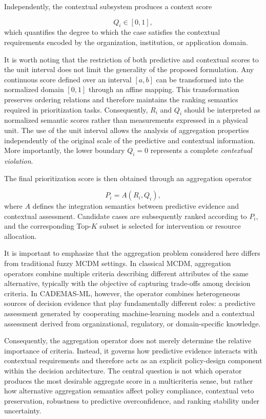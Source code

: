 \documentclass[mathematics,article,submit,moreauthors]{Definitions/mdpi}
\begin{document}
Independently, the contextual subsystem produces a context score

\begin{equation}
Q_i \in [0,1],
\end{equation}
which quantifies the degree to which the case satisfies the contextual
requirements encoded by the organization, institution, or application
domain.

It is worth noting that the restriction of both predictive and
contextual scores to the unit interval does not limit the generality of
the proposed formulation. Any continuous score defined over an interval
$[a,b]$ can be transformed into the normalized domain $[0,1]$ through an
affine mapping. This transformation preserves ordering relations and
therefore maintains the ranking semantics required in prioritization
tasks. Consequently, $R_i$ and $Q_i$ should be interpreted as normalized
semantic scores rather than measurements expressed in a physical unit.
The use of the unit interval allows the analysis of aggregation
properties independently of the original scale of the predictive and
contextual information. More importantly, the lower boundary \(Q_i=0\) represents a complete \textit{contextual violation}.

The final prioritization score is then obtained through an aggregation
operator

\begin{equation}
P_i=A(R_i,Q_i),
\end{equation}
where $A$ defines the integration semantics between predictive evidence
and contextual assessment. Candidate cases are subsequently ranked
according to $P_i$, and the corresponding Top-$K$ subset is selected
for intervention or resource allocation.

It is important to emphasize that the aggregation problem considered
here differs from traditional fuzzy MCDM settings. In classical MCDM,
aggregation operators combine multiple criteria describing different
attributes of the same alternative, typically with the objective of
capturing trade-offs among decision criteria. In CADEMAS-ML, however,
the operator combines heterogeneous sources of decision evidence that
play fundamentally different roles: a predictive assessment generated by
cooperating machine-learning models and a contextual assessment derived
from organizational, regulatory, or domain-specific knowledge.

Consequently, the aggregation operator does not merely determine the
relative importance of criteria. Instead, it governs how predictive
evidence interacts with contextual requirements and therefore acts as an
explicit policy-design component within the decision architecture. The
central question is not which operator produces the most desirable
aggregate score in a multicriteria sense, but rather how alternative
aggregation semantics affect policy compliance, contextual veto
preservation, robustness to predictive overconfidence, and ranking
stability under uncertainty.
\end{document}
